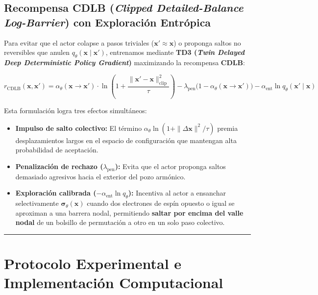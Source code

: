 \documentclass[10pt,a4paper]{article}
\begin{document}
\subsection{Recompensa CDLB (\textit{Clipped Detailed-Balance Log-Barrier}) con Exploración Entrópica}

Para evitar que el actor colapse a pasos triviales ($\mathbf{x}' \approx \mathbf{x}$) o proponga saltos no reversibles que anulen $q_\theta(\mathbf{x} \mid \mathbf{x}')$, entrenamos mediante \textbf{TD3 (\textit{Twin Delayed Deep Deterministic Policy Gradient})} maximizando la recompensa \textbf{CDLB}:



\[
r_{\mathrm{CDLB}}(\mathbf{x}, \mathbf{x}') = \alpha_\theta(\mathbf{x} \to \mathbf{x}') \cdot \ln\!\left(1 + \frac{\|\mathbf{x}' - \mathbf{x}\|_{\mathrm{clip}}^2}{\tau}\right) - \lambda_{\mathrm{pen}}\big(1 - \alpha_\theta(\mathbf{x} \to \mathbf{x}')\big) - \alpha_{\mathrm{ent}} \ln q_\theta(\mathbf{x}' \mid \mathbf{x})
\]



Esta formulación logra tres efectos simultáneos:

\begin{itemize}
\item \textbf{Impulso de salto colectivo:} El término $\alpha_\theta \ln(1 + \|\Delta \mathbf{x}\|^2 / \tau)$ premia desplazamientos largos en el espacio de configuración que mantengan alta probabilidad de aceptación.
\item \textbf{Penalización de rechazo ($\lambda_{\mathrm{pen}}$):} Evita que el actor proponga saltos demasiado agresivos hacia el exterior del pozo armónico.
\item \textbf{Exploración calibrada ($-\alpha_{\mathrm{ent}} \ln q_\theta$):} Incentiva al actor a ensanchar selectivamente $\boldsymbol{\sigma}_\theta(\mathbf{x})$ cuando dos electrones de espín opuesto o igual se aproximan a una barrera nodal, permitiendo \textbf{saltar por encima del valle nodal} de un bolsillo de permutación a otro en un solo paso colectivo.
\end{itemize}




\vspace{0.4cm}\hrule\vspace{0.4cm}




\section{Protocolo Experimental e Implementación Computacional}
\end{document}
